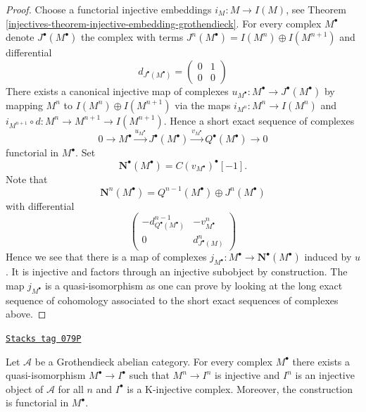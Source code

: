 \begin{proof}

Choose a functorial injective embeddings $i_M : M \to I(M)$, see
Theorem \ref{injectives-theorem-injective-embedding-grothendieck}.
For every complex $M^\bullet$ denote $J^\bullet(M^\bullet)$ the complex
with terms $J^n(M^\bullet) = I(M^n) \oplus I(M^{n + 1})$ and differential
$$
d_{J^\bullet(M^\bullet)} =
\left(
\begin{matrix}
0 & 1 \\
0 & 0
\end{matrix}
\right)
$$
There exists a canonical injective map of complexes
$u_{M^\bullet} : M^\bullet \to J^\bullet(M^\bullet)$ by mapping $M^n$ to
$I(M^n) \oplus I(M^{n + 1})$ via the maps $i_{M^n} : M^n \to I(M^n)$ and
$i_{M^{n + 1}} \circ d : M^n \to M^{n + 1} \to I(M^{n + 1})$. Hence a
short exact sequence of complexes
$$
0 \to M^\bullet \xrightarrow{u_{M^\bullet}}
J^\bullet(M^\bullet) \xrightarrow{v_{M^\bullet}}
Q^\bullet(M^\bullet) \to 0
$$
functorial in $M^\bullet$. Set
$$
\mathbf{N}^\bullet(M^\bullet) = C(v_{M^\bullet})^\bullet[-1].
$$
Note that
$$
\mathbf{N}^n(M^\bullet) = Q^{n - 1}(M^\bullet) \oplus J^n(M^\bullet)
$$
with differential
$$
\left(
\begin{matrix}
- d^{n - 1}_{Q^\bullet(M^\bullet)} & - v^n_{M^\bullet} \\
0 & d^n_{J^\bullet(M)}
\end{matrix}
\right)
$$
Hence we see that there is a map of complexes
$j_{M^\bullet} : M^\bullet \to \mathbf{N}^\bullet(M^\bullet)$
induced by $u$. It is injective and factors through an injective subobject
by construction. The map $j_{M^\bullet}$ is a quasi-isomorphism as one
can prove by looking at the long exact sequence of cohomology associated
to the short exact sequences of complexes above.
\end{proof}

\begin{theorem}
\label{injectives-theorem-K-injective-embedding-grothendieck}
\href{https://stacks.math.columbia.edu/tag/079P}{\texttt{Stacks tag 079P}}


Let $\mathcal{A}$ be a Grothendieck abelian category.
For every complex $M^\bullet$ there exists a quasi-isomorphism
$M^\bullet \to I^\bullet$ such that $M^n \to I^n$ is injective and $I^n$
is an injective object of $\mathcal{A}$ for all $n$ and $I^\bullet$
is a K-injective complex. Moreover, the construction is functorial in
$M^\bullet$.
\end{theorem}

